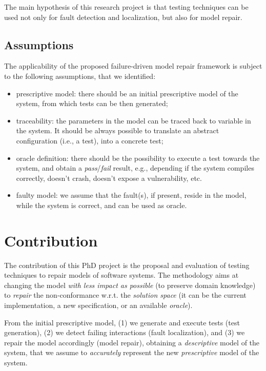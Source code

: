 The main hypothesis of this research project is that testing techniques can be used not only for fault detection and localization, but also for model repair.

\subsection{Assumptions}
The applicability of the proposed failure-driven model repair framework is subject to the following assumptions, that we identified:
\begin{itemize}
	\item prescriptive model: there should be an initial prescriptive model of the system, from which tests can be then generated;
	\item traceability: the parameters in the model can be traced back to variable in the system. It should be always possible to translate an abstract configuration (i.e., a test), into a concrete test;
	\item oracle definition: there should be the possibility to execute a test towards the system, and obtain a \textit{pass}/\textit{fail} result, e.g., depending if the system compiles correctly, doesn't crash, doesn't expose a vulnerability, etc.
	\item faulty model: we assume that the fault(s), if present, reside in the model, while the system is correct, and can be used as oracle.
\end{itemize}

\section{Contribution}\label{sec:contribution}
The contribution of this PhD project is the proposal and evaluation of testing techniques to repair models of software systems.
The methodology aims at changing the model \textit{with less impact as possible} (to preserve domain knowledge) to \textit{repair} the non-conformance w.r.t. the \textit{solution space} (it can be the current implementation, a new specification, or an available \textit{oracle}).

From the initial prescriptive model, (1) we generate and execute tests (test generation), (2) we detect failing interactions (fault localization), and (3) we repair the model accordingly (model repair), obtaining a \textit{descriptive} model of the system, that we assume to \textit{accurately} represent the new \textit{prescriptive} model of the system.

